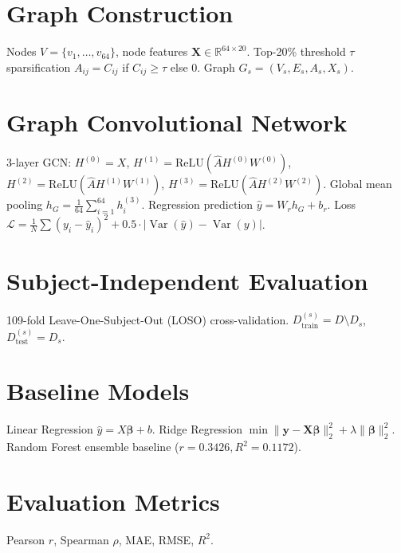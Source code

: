 \documentclass[conference]{IEEEtran}
\begin{document}
\section{Graph Construction}
Nodes $V = \{v_1, \dots, v_{64}\}$, node features $\mathbf{X} \in \mathbb{R}^{64 \times 20}$. Top-20\% threshold $\tau$ sparsification $A_{ij} = C_{ij}$ if $C_{ij} \geq \tau$ else $0$. Graph $G_s = (V_s, E_s, A_s, X_s)$.

\section{Graph Convolutional Network}
3-layer GCN: $H^{(0)} = X$, $H^{(1)} = \text{ReLU}(\hat{A} H^{(0)} W^{(0)})$, $H^{(2)} = \text{ReLU}(\hat{A} H^{(1)} W^{(1)})$, $H^{(3)} = \text{ReLU}(\hat{A} H^{(2)} W^{(2)})$. Global mean pooling $h_G = \frac{1}{64} \sum_{i=1}^{64} h_i^{(3)}$. Regression prediction $\hat{y} = W_r h_G + b_r$. Loss $\mathcal{L} = \frac{1}{N} \sum (y_i - \hat{y}_i)^2 + 0.5 \cdot |\operatorname{Var}(\hat{y}) - \operatorname{Var}(y)|$.

\section{Subject-Independent Evaluation}
109-fold Leave-One-Subject-Out (LOSO) cross-validation. $D_{\text{train}}^{(s)} = D \setminus D_s$, $D_{\text{test}}^{(s)} = D_s$.

\section{Baseline Models}
Linear Regression $\hat{y} = X\boldsymbol{\beta} + b$. Ridge Regression $\min \|\mathbf{y} - \mathbf{X}\boldsymbol{\beta}\|_2^2 + \lambda \|\boldsymbol{\beta}\|_2^2$. Random Forest ensemble baseline ($r = 0.3426, R^2 = 0.1172$).

\section{Evaluation Metrics}
Pearson $r$, Spearman $\rho$, MAE, RMSE, $R^2$.
\end{document}
